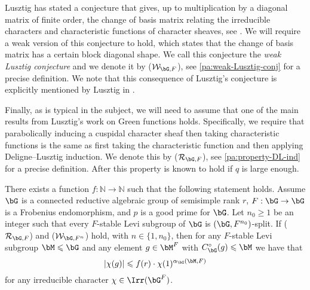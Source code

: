 \documentclass[eqthmnum,nocolour,skinny]{jt-calcs}
\begin{document}
\begin{pa}
Lusztig has stated a conjecture that gives, up to multiplication by a diagonal matrix of finite order, the change of basis matrix relating the irreducible characters and characteristic functions of character sheaves, see \cite{lusztig:2018:on-the-definitions-of-almost-characters}. We will require a weak version of this conjecture to hold, which states that the change of basis matrix has a certain block diagonal shape. We call this conjecture the \emph{weak Lusztig conjecture} and we denote it by ($\mathcal{W}_{\bG,F}$), see \cref{pa:weak-Lusztig-conj} for a precise definition. We note that this consequence of Lusztig's conjecture is explicitly mentioned by Lusztig in \cite[2.12(c)]{lusztig:2018:on-the-definitions-of-almost-characters}.
\end{pa}

\begin{pa}
Finally, as is typical in the subject, we will need to assume that one of the main results from Lusztig's work \cite{lusztig:1990:green-functions-and-character-sheaves} on Green functions holds. Specifically, we require that parabolically inducing a cuspidal character sheaf then taking characteristic functions is the same as first taking the characteristic function and then applying Deligne--Lusztig induction. We denote this by ($\mathcal{R}_{\bG,F}$), see \cref{pa:property-DL-ind} for a precise definition. After \cite{lusztig:1990:green-functions-and-character-sheaves} this property is known to hold if $q$ is large enough.
\end{pa}

\begin{thm}\label{thm:character-bound}
There exists a function $f : \mathbb{N} \to \mathbb{N}$ such that the following statement holds. Assume $\bG$ is a connected reductive algebraic group of semisimple rank $r$, $F : \bG \to \bG$ is a Frobenius endomorphism, and $p$ is a good prime for $\bG$. Let $n_0 \geqslant 1$ be an integer such that every $F$-stable Levi subgroup of $\bG$ is $(\bG,F^{n_0})$-split. If ($\mathcal{R}_{\bG,F}$) and ($\mathcal{W}_{\bG,F^n}$) hold, with $n \in \{1,n_0\}$, then for any $F$-stable Levi subgroup $\bM \leqslant \bG$ and any element $g \in \bM^F$ with $C_{\bG}^{\circ}(g) \leqslant \bM$ we have that
\begin{equation*}
|\chi(g)| \leqslant f(r)\cdot\chi(1)^{\alpha_{\bG}(\bM,F)}
\end{equation*}
for any irreducible character $\chi \in \Irr(\bG^F)$.
\end{thm}
\end{document}
